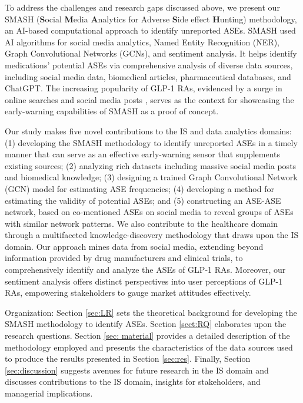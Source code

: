 \documentclass[referee,bst/sn-basic]{sn-jnl}%
\theoremstyle{thmstyletwo}%
\theoremstyle{thmstylethree}%
\begin{document}
To address the challenges and research gaps discussed above, we present our SMASH (\textbf{S}ocial \textbf{M}edia \textbf{A}nalytics for Adverse \textbf{S}ide effect \textbf{H}unting) methodology, an AI-based computational approach to identify unreported ASEs. 
SMASH used AI algorithms for social media analytics, Named Entity Recognition (NER), Graph Convolutional Networks (GCNs), and sentiment analysis. 
It helps identify medications' potential ASEs via comprehensive analysis of diverse data sources, including social media data, biomedical articles, pharmaceutical databases, and ChatGPT. 
The increasing popularity of GLP-1 RAs, evidenced by a surge in online searches \cite{han2023public} and social media posts \cite{keating2023semaglutide}, serves as the context for showcasing the early-warning capabilities of SMASH as a proof of concept.

Our study makes five novel contributions to the IS and data analytics domains: 
(1) developing the SMASH methodology to identify unreported ASEs in a timely manner that can serve as an effective early-warning sensor that supplements existing sources; 
(2) analyzing rich datasets including massive social media posts and biomedical knowledge;
(3) designing a trained Graph Convolutional Network (GCN) model \cite{zhang2019graph} for estimating ASE frequencies; 
(4) developing a method for estimating the validity of potential ASEs; and 
(5) constructing an ASE-ASE network, based on co-mentioned ASEs on social media to reveal groups of ASEs with similar network patterns. 
We also contribute to the healthcare domain through a multifaceted knowledge-discovery methodology that draws upon the IS domain.
Our approach mines data from social media, extending beyond information provided by drug manufacturers and clinical trials, to comprehensively identify and analyze the ASEs of GLP-1 RAs. 
Moreover, our sentiment analysis offers distinct perspectives into user perceptions of GLP-1 RAs, empowering stakeholders to gauge market attitudes effectively.

Organization:
Section \ref{sec:LR} sets the theoretical background for developing the SMASH methodology to  identify ASEs. 
Section \ref{sect:RQ} elaborates upon the research questions. 
Section \ref{sec: material} provides a detailed description of the methodology employed and presents the characteristics of the data sources used to produce the results presented in Section \ref{sec:res}.
Finally, Section \ref{sec:discussion} suggests avenues for future research in the IS domain and discusses contributions to the IS domain, insights for stakeholders, and managerial implications. 
\end{document}
